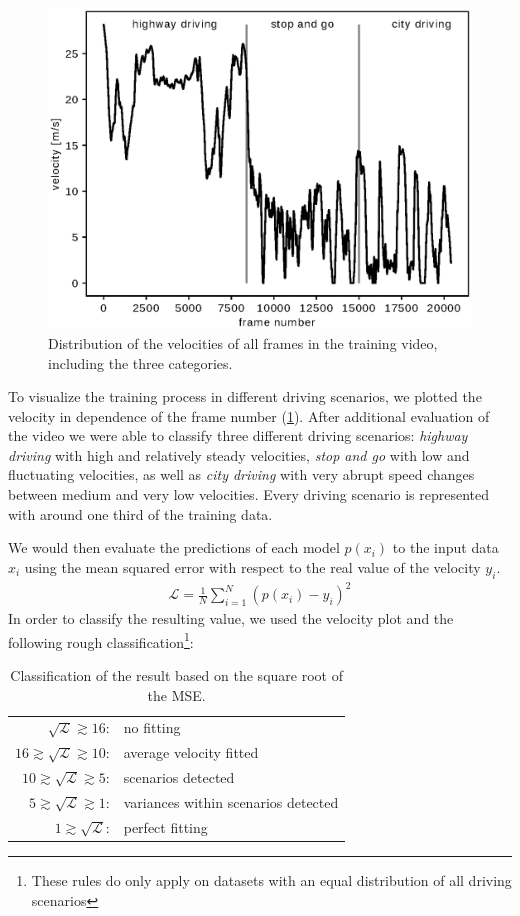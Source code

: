 \documentclass[conference]{IEEEtran}
\begin{document}
\begin{figure}[ht]
	\vspace{-0.5cm}
	\centering
	\includegraphics[width=0.7\columnwidth]{./imgs/plot_speed_time_new_splitting.eps}
	\caption{Distribution of the velocities of all frames in the training video, including the three categories.}
	\label{fig:SpeedPerFrameDistributionNewSplitting}
	\vspace{-0.2cm}
\end{figure}

To visualize the training process in different driving scenarios, we plotted the velocity in dependence of the frame number (\cref{fig:SpeedPerFrameDistributionNewSplitting}). After additional evaluation of the video we were able to classify three different driving scenarios: \emph{highway driving} with high and relatively steady velocities, \emph{stop and go} with low and fluctuating velocities, as well as \emph{city driving} with very abrupt speed changes between medium and very low velocities. Every driving scenario is represented with around one third of the training data.

We would then evaluate the predictions of each model $p(x_i)$ to the input data $x_i$ using the mean squared error with respect to the real value of the velocity $y_i$.
\begin{align*}
	\mathcal{L} = \frac{1}{N} \sum_{i=1}^{N} (p(x_i) - y_i)^2
\end{align*}
In order to classify the resulting value, we used the velocity plot and the 
following rough classification\footnote{These rules do only apply on datasets with an equal distribution 
of all driving scenarios}:
\begin{table}[h!]
\normalsize
\centering
\begin{tabular}{r l}
$\sqrt{\mathcal{L}} \gtrsim 16$: & no fitting\\
$16 \gtrsim \sqrt{\mathcal{L}} \gtrsim 10$: & average velocity fitted\\
$10 \gtrsim \sqrt{\mathcal{L}} \gtrsim 5$: & scenarios detected\\
$5 \gtrsim \sqrt{\mathcal{L}} \gtrsim 1$: & variances within scenarios detected\\
$1 \gtrsim \sqrt{\mathcal{L}}$: & perfect fitting
\end{tabular}
\caption{Classification of the result based on the square root of the MSE.}
\end{table}
\end{document}
